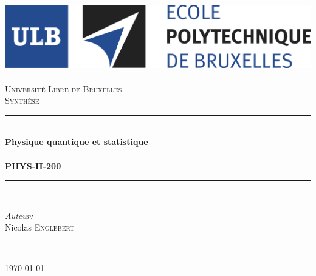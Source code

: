 \documentclass	[11pt, a4paper, openany]{book}
\begin{document}
\renewcommand{\proofname}{Démonstration}
\mainmatter
\begin{titlepage}
\begin{center}	
	
	\newcommand{\HRule}{\rule{\linewidth}{0.5mm}}   			%
	\includegraphics[scale=0.11]{logo.jpg}~\\[1cm]				%

	\textsc{\LARGE Université Libre de Bruxelles}\\[1.5cm]
	\textsc{\Large Synthèse}\\[0.5cm]

	\HRule \\[0.4cm]
	{ \huge \bfseries Physique quantique et statistique \\ \ \\ PHYS-H-200 \\[0.4cm] }


	\HRule \\[1.5cm]
		\begin{minipage}{0.4\textwidth}
		\begin{flushleft} \large
		
		\emph{Auteur:}\\
			Nicolas \textsc{Englebert}\\
			\end{flushleft}
			\end{minipage}
			\begin{minipage}{0.4\textwidth}
			\begin{flushright} \large
			\emph{} \\		
			\textsc{}
			\end{flushright}
		\end{minipage}

	\vfill

{\large \today}

\end{center}
\end{titlepage}




\end{document}
